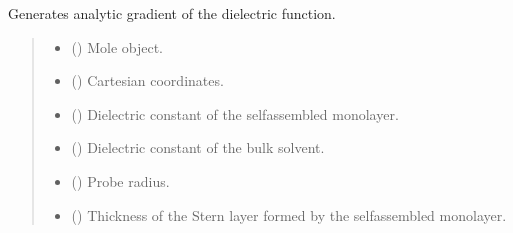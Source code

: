 \documentclass[letterpaper,10pt,english]{sphinxmanual}
\begin{document}
\begin{fulllineitems}
\label{\detokenize{fcdft.solvent:fcdft.solvent.pbe.make_grad_eps}}
\pysigstartsignatures
\pysiglinewithargsret
{}
{\sphinxparamcomma {}\sphinxparamcomma {}\sphinxparamcomma {}\sphinxparamcomma {}\sphinxparamcomma {}\sphinxparamcomma {}\sphinxparamcomma {}\sphinxparamcomma {}\sphinxparamcomma {}\sphinxparamcomma {}}
{}
\pysigstopsignatures
\sphinxAtStartPar
Generates analytic gradient of the dielectric function.
\begin{quote}\begin{description}
\begin{itemize}
\item {} 
\sphinxAtStartPar
{} () \textendash{} Mole object.

\item {} 
\sphinxAtStartPar
{} () \textendash{} Cartesian coordinates.

\item {} 
\sphinxAtStartPar
{} () \textendash{} Dielectric constant of the self\sphinxhyphen{}assembled monolayer.

\item {} 
\sphinxAtStartPar
{} () \textendash{} Dielectric constant of the bulk solvent.

\item {} 
\sphinxAtStartPar
{} () \textendash{} Probe radius.

\item {} 
\sphinxAtStartPar
{} () \textendash{} Thickness of the Stern layer formed by the self\sphinxhyphen{}assembled monolayer.


\end{itemize}
\end{description}
\end{quote}
\end{fulllineitems}
\end{document}
